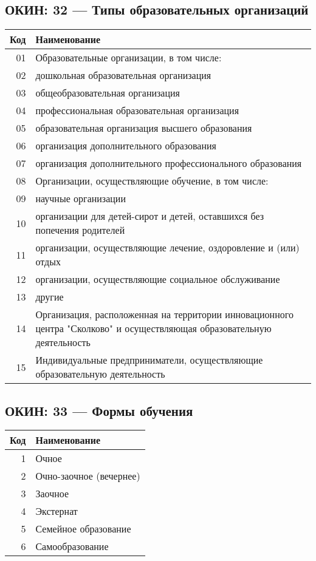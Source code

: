 \documentclass[10pt, a4paper, titlepage]{article}
\begin{document}
\subsection{ОКИН: 32 --- Типы образовательных организаций}

\begin{center}
    \begin{longtable}{rp{}}
        \hline
        \textbf{Код} & \textbf{Наименование} \\ \hline
        01 & Образовательные организации, в том числе: \\
        02 & дошкольная образовательная организация \\
        03 & общеобразовательная организация \\
        04 & профессиональная образовательная организация \\
        05 & образовательная организация высшего образования \\
        06 & организация дополнительного образования \\
        07 & организация дополнительного профессионального образования \\
        08 & Организации, осуществляющие обучение, в том числе: \\
        09 & научные организации \\
        10 & организации для детей-сирот и детей, оставшихся без попечения родителей \\
        11 & организации, осуществляющие лечение, оздоровление и (или) отдых \\
        12 & организации, осуществляющие социальное обслуживание \\
        13 & другие \\
        14 & Организация, расположенная на территории инновационного центра "Сколково" и осуществляющая образовательную деятельность \\
        15 & Индивидуальные предприниматели, осуществляющие образовательную деятельность \\
    \end{longtable}
\end{center}

\subsection{ОКИН: 33 --- Формы обучения}

\begin{center}
    \begin{tabular}{rp{}}
        \hline
        \textbf{Код} & \textbf{Наименование} \\ \hline
        1 & Очное \\
        2 & Очно-заочное (вечернее) \\
        3 & Заочное \\
        4 & Экстернат \\
        5 & Семейное образование \\
        6 & Самообразование \\
    \end{tabular}
\end{center}
\end{document}
